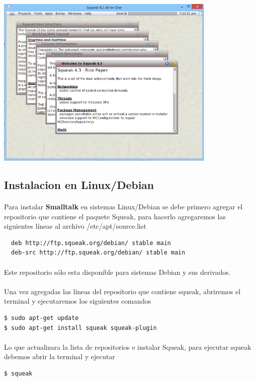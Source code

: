 \documentclass[11pt]{article}
\begin{document}
				\begin{center}
				\includegraphics[width=0.8\textwidth]{images/squeak}
				\end{center}
\subsection{\textbf{Instalacion en Linux/Debian}}
\paragraph{} \noindent
Para instalar \textbf{Smalltalk} en sistemas Linux/Debian se debe primero agregar el repositorio que contiene el paquete Squeak, para hacerlo agregaremos las siguientes líneas al archivo  /etc/apt/source.list

\begin{lstlisting}
  deb http://ftp.squeak.org/debian/ stable main
  deb-src http://ftp.squeak.org/debian/ stable main
\end{lstlisting}
\paragraph{} \noindent
Este repositorio sólo esta disponible para sistemas Debian y sus derivados.
\paragraph{} \noindent
Una vez agregadas las líneas del repositorio que contiene squeak, abriremos el terminal y ejecutaremos los siguientes comandos
\begin{lstlisting}
$ sudo apt-get update
$ sudo apt-get install squeak squeak-plugin
\end{lstlisting}
\paragraph{} \noindent
Lo que actualizara la lista de repositorios e instalar Squeak, para ejecutar squeak debemos abrir la terminal y ejecutar
\begin{lstlisting}
$ squeak
\end{lstlisting}
\end{document}
